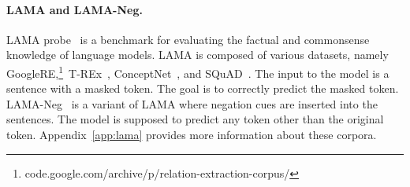 \paragraph{LAMA and LAMA-Neg.}
LAMA probe~\cite{petroni-etal-2019-language} is a benchmark for evaluating the factual and commonsense knowledge of language models.
LAMA is composed of various datasets, namely
GoogleRE,\footnote{\footnotesize {code.google.com/archive/p/relation-extraction-corpus/}}~T-REx~\cite{elsahar-etal-2018-rex}, ConceptNet~\cite{speer-havasi-2012-representing}, and SQuAD~\cite{rajpurkar-etal-2016-squad}. 
The input to the model is a sentence with a masked token.
The goal is to correctly predict the masked token.
LAMA-Neg~\cite{kassner-schutze-2020-negated} is a variant of LAMA where negation cues are inserted into the sentences.
The model is supposed to predict any token other than the original token. 
Appendix~\ref{app:lama} provides more information about these corpora.